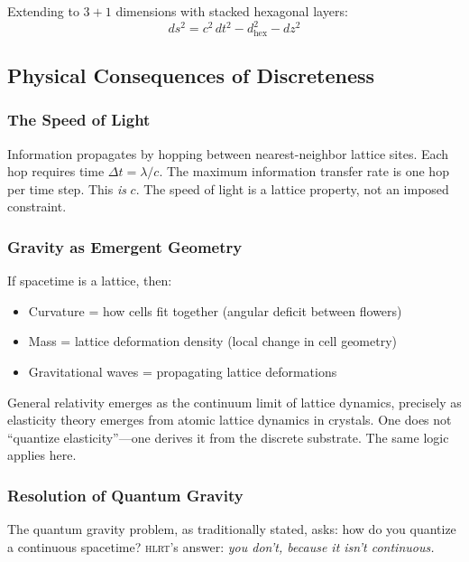 \documentclass[12pt,a4paper]{article}
\theoremstyle{plain}
\theoremstyle{definition}
\newcommand{\HLRT}{\textsc{hlrt}}
\begin{document}
Extending to $3+1$ dimensions with stacked hexagonal layers:
\begin{equation}\label{eq:spacetime}
ds^2 = c^2\,dt^2 - d^2_{\mathrm{hex}} - dz^2
\end{equation}

\subsection{Physical Consequences of Discreteness}

\subsubsection{The Speed of Light}

Information propagates by hopping between nearest-neighbor lattice sites. Each hop requires time $\Delta t = \lambda/c$. The maximum information transfer rate is one hop per time step. This \emph{is} $c$. The speed of light is a lattice property, not an imposed constraint.

\subsubsection{Gravity as Emergent Geometry}

If spacetime is a lattice, then:
\begin{itemize}[nosep]
    \item Curvature = how cells fit together (angular deficit between flowers)
    \item Mass = lattice deformation density (local change in cell geometry)
    \item Gravitational waves = propagating lattice deformations
\end{itemize}

General relativity emerges as the continuum limit of lattice dynamics, precisely as elasticity theory emerges from atomic lattice dynamics in crystals. One does not ``quantize elasticity''---one derives it from the discrete substrate. The same logic applies here.

\subsubsection{Resolution of Quantum Gravity}

The quantum gravity problem, as traditionally stated, asks: how do you quantize a continuous spacetime? \HLRT{}'s answer: \emph{you don't, because it isn't continuous.}
\end{document}
